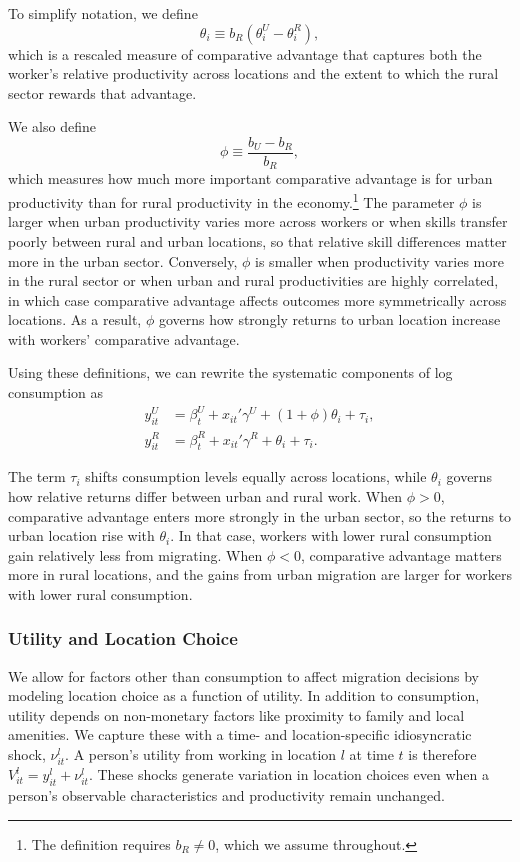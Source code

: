 \documentclass[12pt]{article}
\begin{document}
To simplify notation, we define
\[
\theta_i \equiv b_R(\theta_i^U-\theta_i^R),
\]
which is a rescaled measure of comparative advantage that captures both the worker's relative productivity across locations and the extent to which the rural sector rewards that advantage.

We also define
\[
\phi \equiv \frac{b_U-b_R}{b_R},
\]
which measures how much more important comparative advantage is for urban productivity than for rural productivity in the economy.\footnote{The definition requires $b_R\neq 0$, which we assume throughout.}
The parameter $\phi$ is larger when urban productivity varies more across workers or when skills transfer poorly between rural and urban locations, so that relative skill differences matter more in the urban sector.
Conversely, $\phi$ is smaller when productivity varies more in the rural sector or when urban and rural productivities are highly correlated, in which case comparative advantage affects outcomes more symmetrically across locations.
As a result, $\phi$ governs how strongly returns to urban location increase with workers' comparative advantage.

Using these definitions, we can rewrite the systematic components of log consumption as
\begin{align}
y_{it}^{U} &= \beta_t^U + x_{it}'\gamma^U + (1+\phi)\theta_i + \tau_i, \label{eq:ysys_U_phi}\\
y_{it}^{R} &= \beta_t^R + x_{it}'\gamma^R + \theta_i + \tau_i. \label{eq:ysys_R_phi}
\end{align}

The term $\tau_i$ shifts consumption levels equally across locations, while $\theta_i$ governs how relative returns differ between urban and rural work.
When $\phi>0$, comparative advantage enters more strongly in the urban sector, so the returns to urban location rise with $\theta_i$.
In that case, workers with lower rural consumption gain relatively less from migrating.
When $\phi<0$, comparative advantage matters more in rural locations, and the gains from urban migration are larger for workers with lower rural consumption.

\subsubsection{Utility and Location Choice}

We allow for factors other than consumption to affect migration decisions by modeling location choice as a function of utility. 
In addition to consumption, utility depends on non-monetary factors like proximity to family and local amenities.
We capture these with a time- and location-specific idiosyncratic shock, $\nu_{it}^{l}$. 
A person's utility from working in location $l$ at time $t$ is therefore \(V_{it}^{l} = y_{it}^l + \nu_{it}^{l}\). 
These shocks generate variation in location choices even when a person's observable characteristics and productivity remain unchanged.
\end{document}
